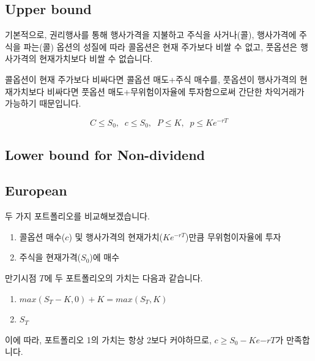 \documentclass[
  letterpaper,
  DIV=11,
  numbers=noendperiod]{scrreprt}
\providecommand{\tightlist}{%
  \setlength{\itemsep}{0pt}\setlength{\parskip}{0pt}}\usepackage{longtable,booktabs,array}
\begin{document}

\subsection*{Upper bound}\label{upper-bound}

기본적으로, 권리행사를 통해 행사가격을 지불하고 주식을 사거나(콜),
행사가격에 주식을 파는(콜) 옵션의 성질에 따라 콜옵션은 현재 주가보다
비쌀 수 없고, 풋옵션은 행사가격의 현재가치보다 비쌀 수 없습니다.

콜옵션이 현재 주가보다 비싸다면 콜옵션 매도+주식 매수를, 풋옵션이
행사가격의 현재가치보다 비싸다면 풋옵션 매도+무위험이자율에 투자함으로써
간단한 차익거래가 가능하기 때문입니다.

\[C\leq S_0,\;\; c\leq S_0,\;\; P\leq K,\;\; p\leq Ke^{-rT}\]

\subsection*{Lower bound for
Non-dividend}\label{lower-bound-for-non-dividend}

\subsection*{European}\label{european}

두 가지 포트폴리오를 비교해보겠습니다.

\begin{enumerate}
\def\labelenumi{\arabic{enumi}.}
\tightlist
\item
  콜옵션 매수(\(c\)) 및 행사가격의 현재가치(\(Ke^{-rT}\))만큼
  무위험이자율에 투자
\item
  주식을 현재가격(\(S_0\))에 매수
\end{enumerate}

만기시점 \(T\)에 두 포트폴리오의 가치는 다음과 같습니다.

\begin{enumerate}
\def\labelenumi{\arabic{enumi}.}
\tightlist
\item
  \(max(S_T-K,0)+K=max(S_T,K)\)
\item
  \(S_T\)
\end{enumerate}

이에 따라, 포트폴리오 1의 가치는 항상 2보다 커야하므로,
\(c\geq S_0-Ke{-rT}\)가 만족합니다.
\end{document}
